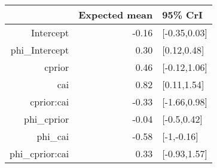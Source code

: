 \begin{tabular}{rrl}
  \hline
 & Expected mean & 95\% CrI \\ 
  \hline
Intercept & -0.16 & [-0.35,0.03] \\ 
  phi\_Intercept & 0.30 & [0.12,0.48] \\ 
  cprior & 0.46 & [-0.12,1.06] \\ 
  cai & 0.82 & [0.11,1.54] \\ 
  cprior:cai & -0.33 & [-1.66,0.98] \\ 
  phi\_cprior & -0.04 & [-0.5,0.42] \\ 
  phi\_cai & -0.58 & [-1,-0.16] \\ 
  phi\_cprior:cai & 0.33 & [-0.93,1.57] \\ 
   \hline
\end{tabular}


